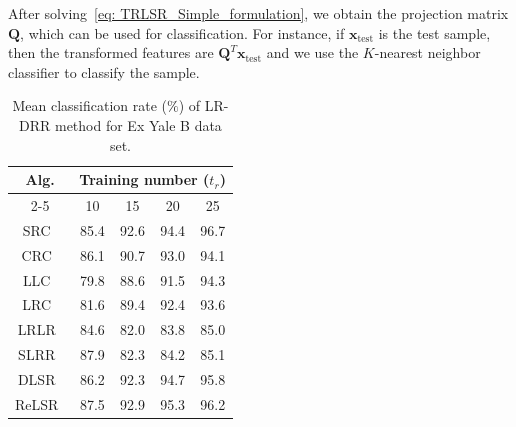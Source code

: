 After solving~\eqref{eq: TRLSR_Simple_formulation}, we obtain the projection matrix $\bm{Q}$, which can be used for classification. For instance, if $\bm{x}_{\text{test}}$ is the test sample, then the transformed features are $\bm{Q}^{T}\bm{x}_{\text{test}}$ and we use the $K$-nearest neighbor classifier to classify the sample. 
%
\begin{table}
\caption{Mean classification rate ($\%$) of LR-DRR method for Ex Yale B data set.}
\label{table: LRDRR_Accuracy_Yale_train}
\centering
\begin{tabular}{|c|cccc|}
\hline
\multirow{2}{*}{Alg.} & \multicolumn{4}{c|}{Training number ($t_r$)}                                                                                 \\ \cline{2-5} 
                      & \multicolumn{1}{c|}{10}            & \multicolumn{1}{c|}{15}            & \multicolumn{1}{c|}{20}            & 25            \\ \hline
SRC~\cite{SRC}                   & \multicolumn{1}{c|}{85.4}          & \multicolumn{1}{c|}{92.6}          & \multicolumn{1}{c|}{94.4}          & 96.7          \\ \hline
CRC~\cite{CRC}                   & \multicolumn{1}{c|}{86.1}          & \multicolumn{1}{c|}{90.7}          & \multicolumn{1}{c|}{93.0}          & 94.1          \\ \hline
LLC~\cite{LLC}                   & \multicolumn{1}{c|}{79.8}          & \multicolumn{1}{c|}{88.6}          & \multicolumn{1}{c|}{91.5}          & 94.3          \\ \hline
LRC~\cite{LRC}                   & \multicolumn{1}{c|}{81.6}          & \multicolumn{1}{c|}{89.4}          & \multicolumn{1}{c|}{92.4}          & 93.6          \\ \hline
LRLR~\cite{LRLR_SLRR}                  & \multicolumn{1}{c|}{84.6}          & \multicolumn{1}{c|}{82.0}          & \multicolumn{1}{c|}{83.8}          & 85.0          \\ \hline
SLRR~\cite{LRLR_SLRR}                  & \multicolumn{1}{c|}{87.9}          & \multicolumn{1}{c|}{82.3}          & \multicolumn{1}{c|}{84.2}          & 85.1          \\ \hline
DLSR~\cite{DLSR}                  & \multicolumn{1}{c|}{86.2}          & \multicolumn{1}{c|}{92.3}          & \multicolumn{1}{c|}{94.7}          & 95.8          \\ \hline
ReLSR~\cite{ReLSR}                 & \multicolumn{1}{c|}{87.5}          & \multicolumn{1}{c|}{92.9}          & \multicolumn{1}{c|}{95.3}          & 96.2          \\ \hline

\end{tabular}
\end{table}
